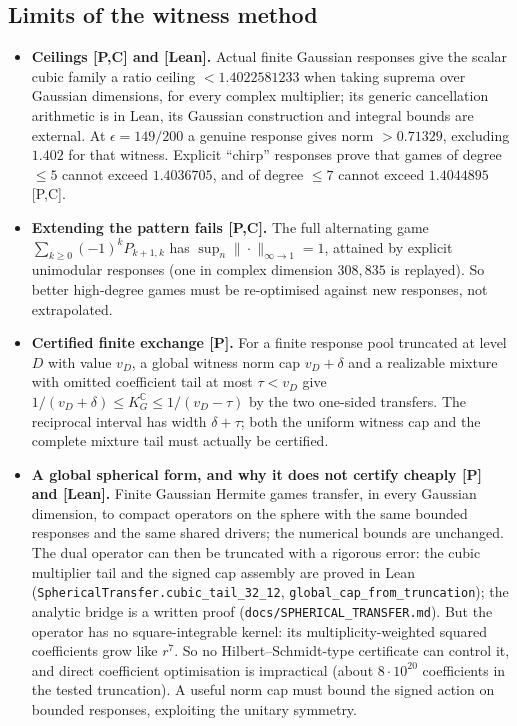 \documentclass[11pt,a4paper]{article}
\newcommand{\C}{\mathbb{C}}
\newcommand{\KG}{K_G^{\C}}
\newcommand{\lean}[1]{\texttt{\small #1}}
\begin{document}
\subsection{Limits of the witness method}
\begin{itemize}
\item \textbf{Ceilings [P,C] and [Lean].} Actual finite Gaussian responses give the scalar cubic family a
 ratio ceiling $<1.4022581233$ when taking suprema over Gaussian dimensions, for every complex multiplier; its generic cancellation arithmetic
 is in Lean, its Gaussian construction and integral bounds are external. At $\epsilon=149/200$ a genuine response
 gives norm $>0.71329$, excluding $1.402$ for that witness. Explicit ``chirp'' responses prove that games of
 degree $\le5$ cannot exceed $1.4036705$, and of degree $\le7$ cannot exceed $1.4044895$ [P,C].
\item \textbf{Extending the pattern fails [P,C].} The full alternating game $\sum_{k\ge0}(-1)^kP_{k+1,k}$ has
 $\sup_n\|\cdot\|_{\infty\to1}=1$, attained by explicit unimodular responses (one in complex dimension $308{,}835$ is
 replayed). So better high-degree games must be re-optimised against new responses, not extrapolated.
\item \textbf{Certified finite exchange [P].} For a finite response pool truncated at level $D$ with value $v_D$, a
 global witness norm cap $v_D+\delta$ and a realizable mixture with omitted coefficient tail at most $\tau<v_D$
 give $1/(v_D+\delta)\le\KG\le1/(v_D-\tau)$ by the two one-sided transfers. The reciprocal interval has width $\delta+\tau$;
 both the uniform witness cap and the complete mixture tail must actually be certified.
\item \textbf{A global spherical form, and why it does not certify cheaply [P] and [Lean].} Finite Gaussian Hermite games
 transfer, in every Gaussian dimension, to compact operators on the sphere with the same bounded responses and the same
 shared drivers; the numerical bounds are unchanged. The dual operator can then be truncated with a rigorous error: the
 cubic multiplier tail and the signed cap assembly are proved in Lean (\lean{SphericalTransfer.cubic\_tail\_32\_12},
 \lean{global\_cap\_from\_truncation}); the analytic bridge is a written proof (\texttt{docs/SPHERICAL\_TRANSFER.md}). But
 the operator has no square-integrable kernel: its multiplicity-weighted squared coefficients grow like $r^7$. So no
 Hilbert--Schmidt-type certificate can control it, and direct coefficient optimisation is impractical (about
 $8\cdot10^{20}$ coefficients in the tested truncation). A useful norm cap must bound the signed action on bounded
 responses, exploiting the unitary symmetry.
\end{itemize}
\end{document}

